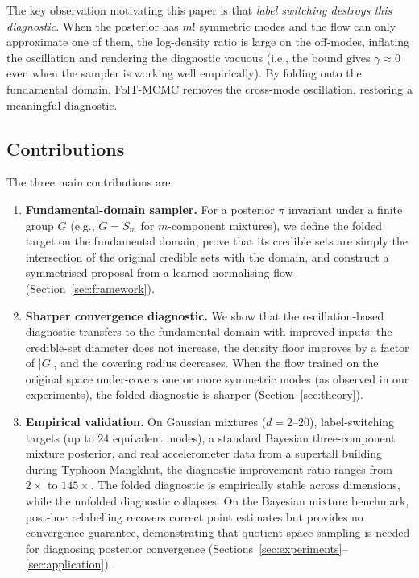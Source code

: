 The key observation motivating this paper is that
\emph{label switching destroys this diagnostic}.  When the
posterior has $m!$ symmetric modes and the flow can only
approximate one of them, the log-density ratio is large on the
off-modes, inflating the oscillation and rendering the
diagnostic vacuous (i.e., the bound gives $\gamma \approx 0$
even when the sampler is working well empirically).  By folding
onto the fundamental domain, FolT-MCMC removes the cross-mode
oscillation, restoring a meaningful diagnostic.

\subsection{Contributions}

The three main contributions are:
\begin{enumerate}[nosep]
  \item \textbf{Fundamental-domain sampler.}
  For a posterior $\pi$ invariant under a finite group $G$
  (e.g., $G = S_m$ for $m$-component mixtures), we define
  the folded target on the fundamental domain, prove that its
  credible sets are simply the intersection of the original
  credible sets with the domain, and construct a symmetrised
  proposal from a learned normalising flow
  (Section~\ref{sec:framework}).

  \item \textbf{Sharper convergence diagnostic.}
  We show that the oscillation-based diagnostic transfers
  to the fundamental domain with improved inputs: the
  credible-set diameter does not increase, the density floor
  improves by a factor of $|G|$, and the covering radius
  decreases.  When the flow trained on the original space
  under-covers one or more symmetric modes (as observed in our
  experiments), the folded diagnostic is sharper
  (Section~\ref{sec:theory}).

  \item \textbf{Empirical validation.}
  On Gaussian mixtures ($d = 2$--$20$), label-switching
  targets (up to $24$ equivalent modes), a standard Bayesian
  three-component mixture posterior, and real accelerometer
  data from a supertall building during Typhoon Mangkhut,
  the diagnostic improvement ratio ranges from $2\times$ to
  $145\times$.  The folded diagnostic is empirically stable
  across dimensions, while the unfolded diagnostic collapses.
  On the Bayesian mixture benchmark, post-hoc relabelling
  recovers correct point estimates but provides no convergence
  guarantee, demonstrating that quotient-space sampling is
  needed for diagnosing posterior convergence
  (Sections~\ref{sec:experiments}--\ref{sec:application}).
\end{enumerate}

